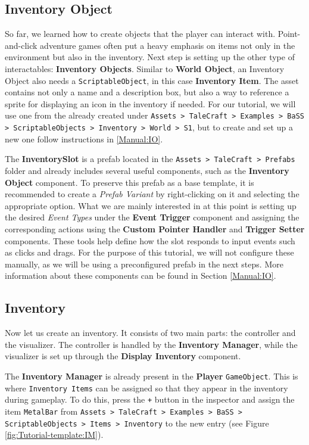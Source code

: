 \subsection{Inventory Object} 
So far, we learned how to create objects that the player can interact with. Point-and-click adventure games often put a heavy emphasis on items not only in the environment but also in the inventory. Next step is setting up the other type of interactables: \textbf{Inventory Objects}. Similar to \textbf{World Object}, an Inventory Object also needs a \verb|ScriptableObject|, in this case \textbf{Inventory Item}. The asset contains not only a name and a description box, but also a way to reference a sprite for displaying an icon in the inventory if needed. For our tutorial, we will use one from the already created under \texttt{Assets > TaleCraft > Examples > BaSS > ScriptableObjects > Inventory > World > S1}, but to create and set up a new one follow instructions in \ref{Manual:IO}.

The \textbf{InventorySlot} is a prefab located in the \texttt{Assets > TaleCraft > Prefabs} folder and already includes several useful components, such as the \textbf{Inventory Object} component. To preserve this prefab as a base template, it is recommended to create a \textit{Prefab Variant} by right-clicking on it and selecting the appropriate option. What we are mainly interested in at this point is setting up the desired \textit{Event Types} under the \textbf{Event Trigger} component and assigning the corresponding actions using the \textbf{Custom Pointer Handler} and \textbf{Trigger Setter} components. These tools help define how the slot responds to input events such as clicks and drags. For the purpose of this tutorial, we will not configure these manually, as we will be using a preconfigured prefab in the next steps. More information about these components can be found in Section \ref{Manual:IO}.


\subsection{Inventory}
Now let us create an inventory. It consists of two main parts: the controller and the visualizer. The controller is handled by the \textbf{Inventory Manager}, while the visualizer is set up through the \textbf{Display Inventory} component.

The \textbf{Inventory Manager} is already present in the \textbf{Player} \verb|GameObject|. This is where \texttt{Inventory Items} can be assigned so that they appear in the inventory during gameplay. To do this, press the \texttt{+} button in the inspector and assign the item \verb|MetalBar| from \texttt{Assets > TaleCraft > Examples > BaSS > ScriptableObjects > Items > Inventory} to the new entry (see Figure \ref{fig:Tutorial-template:IM}).

